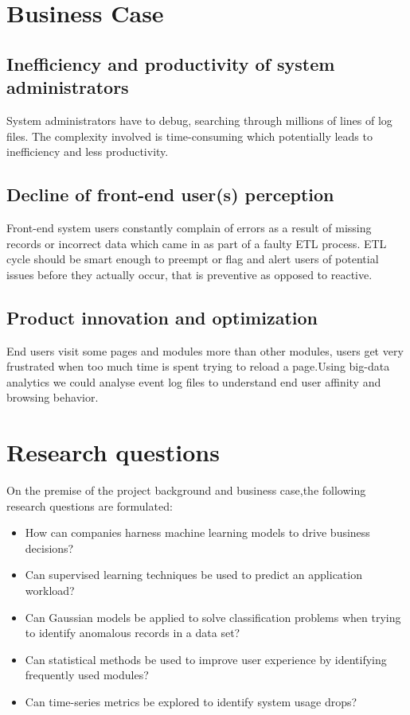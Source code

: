 \documentclass[12pt, letterpaper, titlepage]{report}
\begin{document}
\section{Business Case}
\subsection{Inefficiency and productivity of system administrators}
System administrators have to debug, searching through millions of lines of log files. The complexity involved is time-consuming which potentially leads to inefficiency and less productivity.

\subsection{Decline of front-end user(s) perception}
Front-end system users constantly complain of errors as a result of missing records or incorrect data which came in as part of a faulty  ETL process. ETL cycle should be smart enough to preempt or flag and alert users of potential issues before they actually occur, that is preventive as opposed to reactive.

\subsection{Product innovation and optimization}
End users visit some pages and modules more than other modules, users get very frustrated when too much time is spent trying to reload a page.Using big-data analytics we could analyse event log files to understand end user affinity and browsing behavior. 

\section{Research questions}
On the premise of the project background and business case,the following research questions are formulated:

\begin{itemize}
	\item How can companies harness machine learning models to drive business decisions?
	\item Can supervised learning techniques be used to predict an application workload?
	\item Can Gaussian models be applied to solve classification problems when trying to identify anomalous records in a data set?
	\item Can statistical methods be used to improve user experience by identifying frequently used modules?
	\item Can time-series metrics be explored to identify system usage drops?
\end{itemize}
\end{document}

